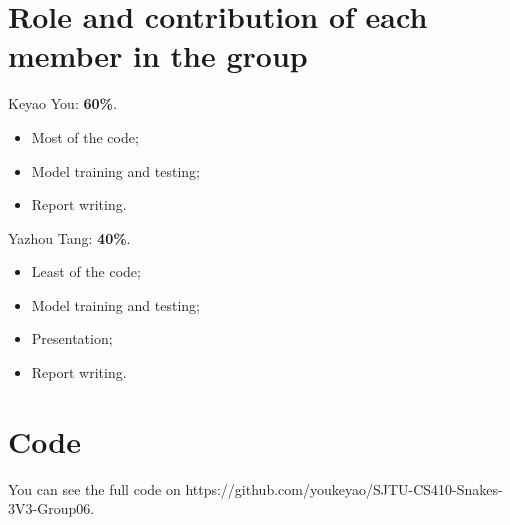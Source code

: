 \documentclass{article}
\begin{document}

\clearpage

\appendix

\section{Role and contribution of each member in the group}

\begin{multicols}{2}
Keyao You: \textbf{60\%}.
\begin{itemize}
    \item Most of the code;
    \item Model training and testing;
    \item Report writing.
\end{itemize}

\quad

Yazhou Tang: \textbf{40\%}.
\begin{itemize}
    \item Least of the code;
    \item Model training and testing;
    \item Presentation;
    \item Report writing.
\end{itemize}
\end{multicols}

\section{Code}

You can see the full code on https://github.com/youkeyao/SJTU-CS410-Snakes-3V3-Group06.


\end{document}
